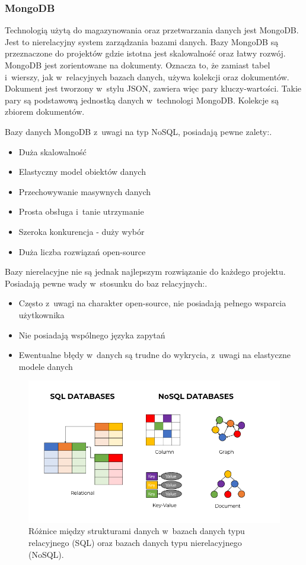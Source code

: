 \subsubsection{MongoDB}
Technologią użytą do magazynowania oraz przetwarzania danych jest MongoDB. Jest to nierelacyjny system zarządzania bazami danych. Bazy MongoDB są przeznaczone do projektów gdzie istotna jest skalowalność oraz łatwy rozwój\cite{mongoDoc}. MongoDB jest zorientowane na dokumenty. Oznacza to, że zamiast tabel i~wierszy, jak w~relacyjnych bazach danych, używa kolekcji oraz dokumentów. Dokument jest tworzony w~stylu JSON, zawiera więc pary kluczy-wartości. Takie pary są podstawową jednostką danych w~technologi MongoDB. Kolekcje są zbiorem dokumentów.

Bazy danych MongoDB z~uwagi na typ NoSQL, posiadają pewne zalety:\cite{noSql}. 
\begin{itemize}
\item Duża skalowalność 
\item Elastyczny model obiektów danych
\item Przechowywanie masywnych danych
\item Prosta obsługa i~tanie utrzymanie
\item Szeroka konkurencja - duży wybór 
\item Duża liczba rozwiązań open-source
\end{itemize}
Bazy nierelacyjne nie są jednak najlepszym rozwiązanie do każdego projektu. Posiadają pewne wady w~stosunku do baz relacyjnych:\cite{noSql}. 
\begin{itemize}
\item Często z~uwagi na charakter open-source, nie posiadają pełnego wsparcia użytkownika
\item Nie posiadają wspólnego języka zapytań
\item Ewentualne błędy w~danych są trudne do wykrycia, z~uwagi na elastyczne modele danych
\end{itemize}

\begin{figure}[ht!]
\centering\includegraphics[width=\textwidth]{figures/sqlvsnosql.png}
\caption{Różnice między strukturami danych w~bazach danych typu relacyjnego (SQL) oraz bazach danych typu nierelacyjnego (NoSQL).}
\label{fig:sqlvsnosql}
\end{figure}

